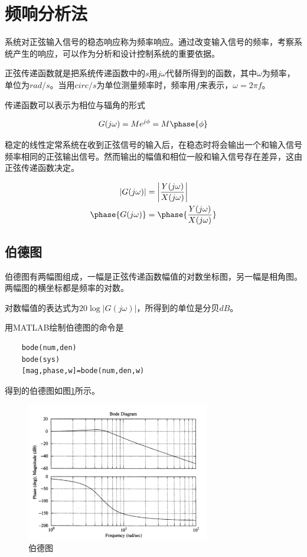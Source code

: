 \section{频响分析法}

系统对正弦输入信号的稳态响应称为频率响应。通过改变输入信号的频率，考察系统产生的响应，可以作为分析和设计控制系统的重要依据。

正弦传递函数就是把系统传递函数中的$s$用$j\omega$代替所得到的函数，其中$\omega$为频率，单位为$rad/s$。当用$circ/s$为单位测量频率时，频率用$f$来表示，$\omega=2\pi f$。

传递函数可以表示为相位与辐角的形式

\begin{equation*}
    G(j\omega)=Me^{j\phi}=M\phase{\phi}
\end{equation*}

稳定的线性定常系统在收到正弦信号的输入后，在稳态时将会输出一个和输入信号频率相同的正弦输出信号。然而输出的幅值和相位一般和输入信号存在差异，这由正弦传递函数决定。

\begin{align*}
    |G(j \omega)|&=\left|\frac{Y(j \omega)}{X(j \omega)}\right|\\ 
    \phase{G(j \omega)}&=\phase{\frac{Y(j \omega)}{X(j \omega)}}
\end{align*}

\subsection{伯德图}

伯德图有两幅图组成，一幅是正弦传递函数幅值的对数坐标图，另一幅是相角图。两幅图的横坐标都是频率的对数。

对数幅值的表达式为$20\log\left|G(j\omega)\right|$，所得到的单位是分贝$dB$。

用MATLAB绘制伯德图的命令是

\begin{lstlisting}
    bode(num,den)
    bode(sys)
    [mag,phase,w]=bode(num,den,w)
\end{lstlisting}

得到的伯德图如图\ref{22}所示。

\begin{figure}[!ht]
    \centering
    \includegraphics[width=8cm]{figures/22.png}
    \caption{伯德图}
    \label{22}
\end{figure}

